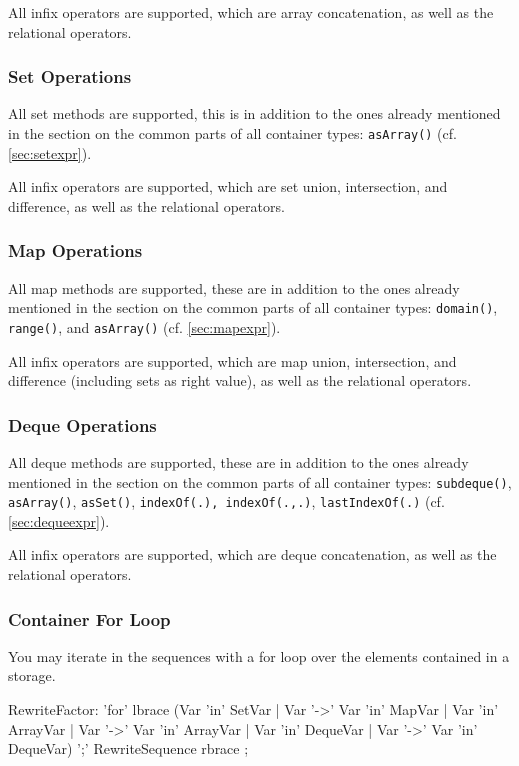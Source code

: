 All infix operators are supported, which are array concatenation, as well as the relational operators.

\subsubsection*{Set Operations}
All set methods are supported, this is in addition to the ones already mentioned in the section on the common parts of all container types: \texttt{asArray()} (cf. \ref{sec:setexpr}).

All infix operators are supported, which are set union, intersection, and difference, as well as the relational operators.

\subsubsection*{Map Operations}
All map methods are supported, these are in addition to the ones already mentioned in the section on the common parts of all container types: \texttt{domain()}, \texttt{range()}, and \texttt{asArray()} (cf. \ref{sec:mapexpr}).

All infix operators are supported, which are map union, intersection, and difference (including sets as right value), as well as the relational operators.

\subsubsection*{Deque Operations}
All deque methods are supported, these are in addition to the ones already mentioned in the section on the common parts of all container types: \texttt{subdeque()}, \texttt{asArray()}, \texttt{asSet()}, \texttt{indexOf(.), \texttt{indexOf(.,.)}}, \texttt{lastIndexOf(.)} (cf. \ref{sec:dequeexpr}).

All infix operators are supported, which are deque concatenation, as well as the relational operators.

\subsubsection*{Container For Loop}

You may iterate in the sequences with a for loop over the elements contained in a storage.

\begin{rail}
  RewriteFactor:
    'for' lbrace (Var 'in' SetVar | Var '->' Var 'in' MapVar | Var 'in' ArrayVar | Var '->' Var 'in' ArrayVar | Var 'in' DequeVar | Var '->' Var 'in' DequeVar) ';' RewriteSequence rbrace
    ;
\end{rail}\label{forstorage}

